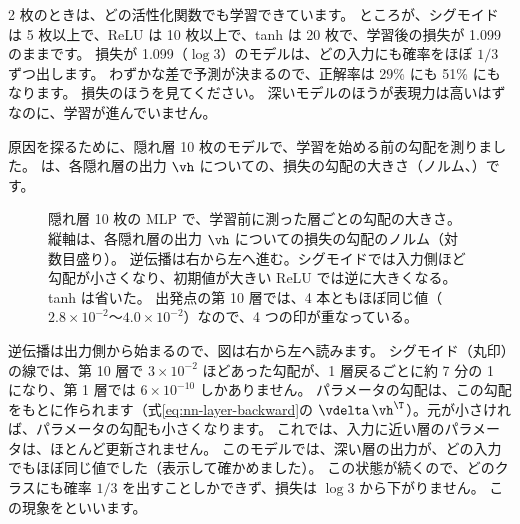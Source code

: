 2 枚のときは、どの活性化関数でも学習できています。
ところが、シグモイドは 5 枚以上で、ReLU は 10 枚以上で、tanh は 20 枚で、学習後の損失が 1.099 のままです。
損失が 1.099（$\log 3$）のモデルは、どの入力にも確率をほぼ $1/3$ ずつ出します。
わずかな差で予測が決まるので、正解率は 29\% にも 51\% にもなります。
損失のほうを見てください。
深いモデルのほうが表現力は高いはずなのに、学習が進んでいません。

原因を探るために、隠れ層 10 枚のモデルで、学習を始める前の勾配を測りました。
は、各隠れ層の出力 $\vh$ についての、損失の勾配の大きさ（ノルム、）です。

\begin{figure}[tbp]
\centering
{}
\caption{隠れ層 10 枚の MLP で、学習前に測った層ごとの勾配の大きさ。
縦軸は、各隠れ層の出力 $\vh$ についての損失の勾配のノルム（対数目盛り）。
逆伝播は右から左へ進む。シグモイドでは入力側ほど勾配が小さくなり、初期値が大きい ReLU では逆に大きくなる。tanh は省いた。
出発点の第 10 層では、4 本ともほぼ同じ値（$2.8\times10^{-2}$〜$4.0\times10^{-2}$）なので、4 つの印が重なっている。}
\label{fig:nn-grad-norms}
\end{figure}

逆伝播は出力側から始まるので、図は右から左へ読みます。
シグモイド（丸印）の線では、第 10 層で $3\times10^{-2}$ ほどあった勾配が、1 層戻るごとに約 7 分の 1 になり、第 1 層では $6\times10^{-10}$ しかありません。
パラメータの勾配は、この勾配をもとに作られます（式\eqref{eq:nn-layer-backward}の $\vdelta\,\vh^\T$）。元が小さければ、パラメータの勾配も小さくなります。
これでは、入力に近い層のパラメータは、ほとんど更新されません。
このモデルでは、深い層の出力が、どの入力でもほぼ同じ値でした（表示して確かめました）。
この状態が続くので、どのクラスにも確率 $1/3$ を出すことしかできず、損失は $\log 3$ から下がりません。
この現象をといいます。

